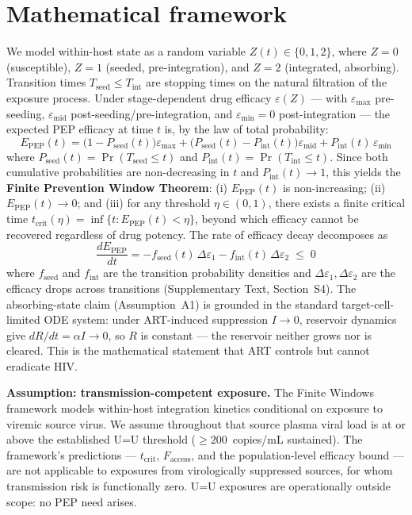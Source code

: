 \documentclass[11pt]{article}
\theoremstyle{definition}
\theoremstyle{remark}
\newcommand{\Tseed}{T_{\text{seed}}}
\newcommand{\Tint}{T_{\text{int}}}
\newcommand{\Pseed}{P_{\text{seed}}}
\newcommand{\Pint}{P_{\text{int}}}
\newcommand{\Epep}{E_{\text{PEP}}}
\newcommand{\Faccess}{F_{\text{access}}}
\newcommand{\tcrit}{t_{\text{crit}}}
\newcommand{\emax}{\varepsilon_{\max}}
\newcommand{\emid}{\varepsilon_{\text{mid}}}
\newcommand{\emin}{\varepsilon_{\min}}
\begin{document}
\section*{Mathematical framework}

We model within-host state as a random variable $Z(t) \in \{0, 1, 2\}$, where $Z=0$ (susceptible), $Z=1$ (seeded, pre-integration), and $Z=2$ (integrated, absorbing). Transition times $\Tseed \leq \Tint$ are stopping times on the natural filtration of the exposure process. Under stage-dependent drug efficacy $\varepsilon(Z)$ --- with $\emax$ pre-seeding, $\emid$ post-seeding/pre-integration, and $\emin = 0$ post-integration --- the expected PEP efficacy at time $t$ is, by the law of total probability:
\begin{equation}
\Epep(t) = \big(1 - \Pseed(t)\big)\emax + \big(\Pseed(t) - \Pint(t)\big)\emid + \Pint(t)\,\emin
\label{eq:master}
\end{equation}
where $\Pseed(t) = \Pr(\Tseed \leq t)$ and $\Pint(t) = \Pr(\Tint \leq t)$. Since both cumulative probabilities are non-decreasing in $t$ and $\Pint(t) \to 1$, this yields the \textbf{Finite Prevention Window Theorem}: (i) $\Epep(t)$ is non-increasing; (ii) $\Epep(t) \to 0$; and (iii) for any threshold $\eta \in (0,1)$, there exists a finite critical time $\tcrit(\eta) = \inf\{t : \Epep(t) < \eta\}$, beyond which efficacy cannot be recovered regardless of drug potency. The rate of efficacy decay decomposes as
\begin{equation}
\frac{d\Epep}{dt} = -f_{\text{seed}}(t)\,\Delta\varepsilon_{1} - f_{\text{int}}(t)\,\Delta\varepsilon_{2} \;\leq\; 0
\label{eq:hazard}
\end{equation}
where $f_{\text{seed}}$ and $f_{\text{int}}$ are the transition probability densities and $\Delta\varepsilon_{1}, \Delta\varepsilon_{2}$ are the efficacy drops across transitions (Supplementary Text, Section~S4). The absorbing-state claim (Assumption~A1) is grounded in the standard target-cell-limited ODE system\cite{perelson1996}: under ART-induced suppression $I \to 0$, reservoir dynamics give $dR/dt = \alpha I \to 0$, so $R$ is constant --- the reservoir neither grows nor is cleared. This is the mathematical statement that ART controls but cannot eradicate HIV.

\textbf{Assumption: transmission-competent exposure.} The Finite Windows framework models within-host integration kinetics conditional on exposure to viremic source virus. We assume throughout that source plasma viral load is at or above the established U=U threshold ($\geq 200$~copies/mL sustained). The framework's predictions --- $\tcrit$, $\Faccess$, and the population-level efficacy bound --- are not applicable to exposures from virologically suppressed sources, for whom transmission risk is functionally zero\cite{rodger2019,bavinton2018}. U=U exposures are operationally outside scope: no PEP need arises.
\end{document}
